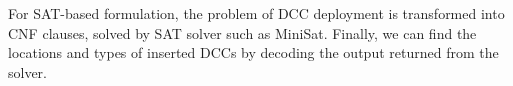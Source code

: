 For SAT-based formulation, the problem of DCC deployment is transformed into CNF clauses, solved by SAT solver such as MiniSat. Finally, we can find the locations and types of inserted DCCs by decoding the output returned from the solver.




